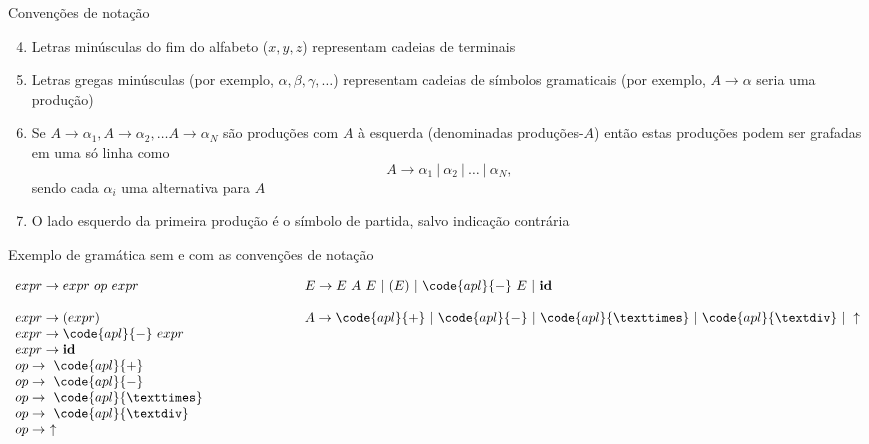 \begin{frame}[fragile]{Convenções de notação}

    \begin{enumerate}
        \setcounter{enumi}{3}
        \item Letras minúsculas do fim do alfabeto ($x, y, z$) representam cadeias de terminais
        \pause

        \item Letras gregas minúsculas (por exemplo, $\alpha, \beta, \gamma, \ldots$) representam cadeias de símbolos gramaticais (por exemplo, $A\to \alpha$ seria
            uma produção)
        \pause

        \item Se $A\to \alpha_1, A\to \alpha_2, \ldots A\to \alpha_N$ são produções com $A$ à esquerda (denominadas produções-$A$) então estas produções podem
            ser grafadas em uma só linha como
            \[
                A\to \alpha_1\ |\ \alpha_2\ |\ \ldots \ |\ \alpha_N,
            \]
            sendo cada $\alpha_i$ uma alternativa para $A$
        \pause

        \item O lado esquerdo da primeira produção é o símbolo de partida, salvo indicação contrária
    \end{enumerate}

\end{frame}

\begin{frame}[fragile]{Exemplo de gramática sem e com as convenções de notação}

\[
    \begin{array}{lp{2cm}l}
        expr \to expr\ op\ expr & \hspace{2in} & E \to E\ A\ E\ |\ (E)\ |\ \code{apl}{-}\ E\ |\ \textbf{id} \\
        expr \to (expr) & & A\to \code{apl}{+}\ |\ \code{apl}{-}\ |\ \code{apl}{×}\ |\ \code{apl}{÷}\ |\ \uparrow \\
        expr \to \code{apl}{-}\ expr \\
        expr \to \textbf{id} \\
        op \to\ \code{apl}{+} \\
        op \to\ \code{apl}{-} \\
        op \to\ \code{apl}{×} \\
        op \to\ \code{apl}{÷} \\
        op \to\ \uparrow
    \end{array}
\]

\end{frame}

